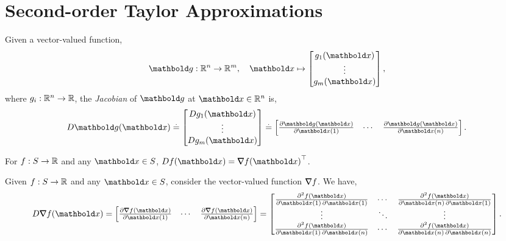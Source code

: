 \section{Second-order Taylor Approximations}

\begin{defn}[Jacobian] Given a vector-valued function, \begin{align*}
    \vg: \R^n \to \R^m, \quad \vx \mapsto \begin{bmatrix}
        g_1(\vx) \\
        \vdots \\
        g_m(\vx) \\
    \end{bmatrix},
\end{align*} where $g_i: \mathbb{R}^n \to \mathbb{R}$, the \emph{Jacobian} of $\vg$ at $\vx \in \R^n$ is, \begin{align}
    D \vg(\vx) \defeq \begin{bmatrix}
        D g_1(\vx) \\
        \vdots \\
        D g_m(\vx) \\
    \end{bmatrix} \defeq \begin{bmatrix}
        \pdv{\vg(\vx)}{\vx(1)} & \cdots & \pdv{\vg(\vx)}{\vx(n)}
    \end{bmatrix}.
\end{align}
\end{defn}
\begin{rmk} For $f: S \to \mathbb{R}$ and any $\vx \in \sS$, $D f(\vx) = \trans{\grad f(\vx)}$.
\end{rmk}
\begin{ex}
Given $f: S \to \mathbb{R}$ and any $\vx \in \sS$, consider the vector-valued function $\nabla\!\!\!\!\!\nabla f$. We have, \begin{align}
    D \grad f(\vx) = \begin{bmatrix}
        \pdv{\grad f(\vx)}{\vx(1)} & \cdots & \pdv{\grad f(\vx)}{\vx(n)}
    \end{bmatrix} = \begin{bmatrix}
        \pdv{f(\vx)}{\vx(1),\vx(1)} & \cdots & \pdv{f(\vx)}{\vx(n),\vx(1)} \\
        \vdots & \ddots & \vdots \\
        \pdv{f(\vx)}{\vx(1),\vx(n)} & \cdots & \pdv{f(\vx)}{\vx(n),\vx(n)}
    \end{bmatrix}. \label{eq:jacobian_hessian}
\end{align}
\end{ex}

